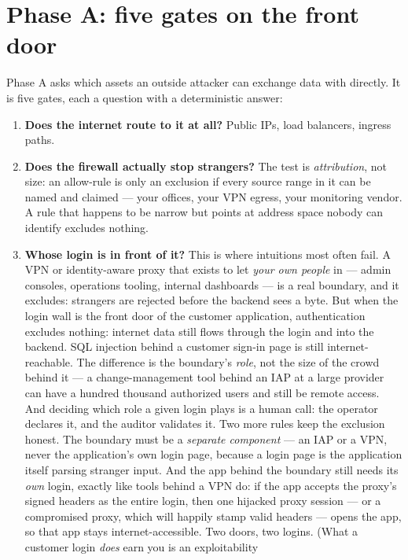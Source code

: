 \documentclass[11pt]{article}
\begin{document}
\section*{Phase A: five gates on the front door}
Phase A asks which assets an outside attacker can exchange data with directly. It
is five gates, each a question with a deterministic answer:

\begin{enumerate}[leftmargin=1.8em]
\item \textbf{Does the internet route to it at all?} Public IPs, load balancers,
  ingress paths.
\item \textbf{Does the firewall actually stop strangers?} The test is
  \emph{attribution}, not size: an allow-rule is only an exclusion if every source
  range in it can be named and claimed --- your offices, your VPN egress, your
  monitoring vendor. A rule that happens to be narrow but points at address space
  nobody can identify excludes nothing.
\item \textbf{Whose login is in front of it?} This is where intuitions most often
  fail. A VPN or identity-aware proxy that exists to let \emph{your own people} in
  --- admin consoles, operations tooling, internal dashboards --- is a real
  boundary, and it excludes: strangers are rejected before the backend sees a
  byte. But when the login wall is the front door of the customer application,
  authentication excludes nothing: internet data still flows through the login
  and into the backend. SQL injection behind a customer sign-in page is still
  internet-reachable. The difference is the boundary's \emph{role}, not the size
  of the crowd behind it --- a change-management tool behind an IAP at a large
  provider can have a hundred thousand authorized users and still be remote
  access. And deciding which role a given login plays is a human call: the
  operator declares it, and the auditor validates it. Two more rules keep the
  exclusion honest. The boundary must be a \emph{separate component} --- an IAP
  or a VPN, never the application's own login page, because a login page is the
  application itself parsing stranger input. And the app behind the boundary
  still needs its \emph{own} login, exactly like tools behind a VPN do: if the
  app accepts the proxy's signed headers as the entire login, then one hijacked
  proxy session --- or a compromised proxy, which will happily stamp valid
  headers --- opens the app, so that app stays internet-accessible. Two doors,
  two logins. (What a customer login \emph{does} earn you is an exploitability

\end{enumerate}
\end{document}
